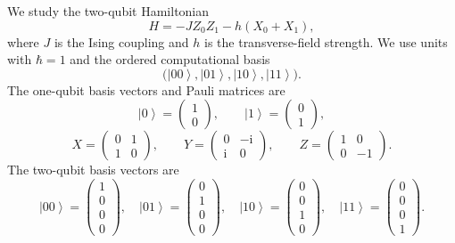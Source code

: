 \documentclass[11pt,a4paper]{article}
\newcommand{\ket}[1]{\left|#1\right\rangle}
\newcommand{\ii}{\mathrm{i}}
\begin{document}
We study the two-qubit Hamiltonian
\begin{equation}
H=-J Z_0 Z_1-h(X_0+X_1),
\label{eq:H}
\end{equation}
where $J$ is the Ising coupling and $h$ is the transverse-field strength. We use units with $\hbar=1$ and the ordered computational basis
\begin{equation}
\bigl(\ket{00},\ket{01},\ket{10},\ket{11}\bigr).
\end{equation}
The one-qubit basis vectors and Pauli matrices are
\begin{equation}
\ket{0}=\begin{pmatrix}1\\0\end{pmatrix},\qquad
\ket{1}=\begin{pmatrix}0\\1\end{pmatrix},
\end{equation}
\begin{equation}
X=\begin{pmatrix}0&1\\1&0\end{pmatrix},\qquad
Y=\begin{pmatrix}0&-\ii\\ \ii&0\end{pmatrix},\qquad
Z=\begin{pmatrix}1&0\\0&-1\end{pmatrix}.
\end{equation}
The two-qubit basis vectors are
\begin{equation}
\ket{00}=\begin{pmatrix}1\\0\\0\\0\end{pmatrix},\quad
\ket{01}=\begin{pmatrix}0\\1\\0\\0\end{pmatrix},\quad
\ket{10}=\begin{pmatrix}0\\0\\1\\0\end{pmatrix},\quad
\ket{11}=\begin{pmatrix}0\\0\\0\\1\end{pmatrix}.
\end{equation}
\end{document}
